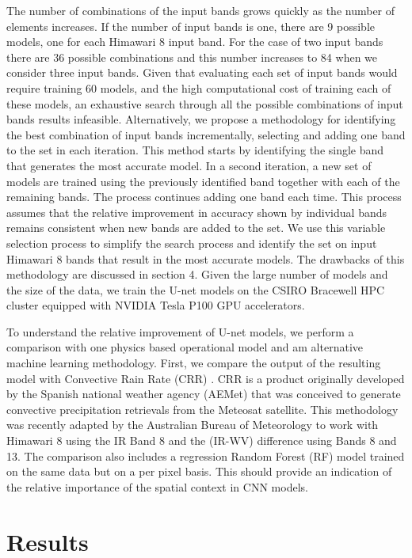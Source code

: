 \documentclass[3p,times]{elsarticle}
\begin{document}
The number of combinations of the input bands grows quickly as the number of elements increases. If the number of input bands is one, there are 9 possible models, one for each Himawari 8 input band. For the case of two input bands there are 36 possible combinations and this number increases to 84 when we consider three input bands. Given that evaluating each set of input bands would require training 60 models, and the high computational cost of training each of these models, an exhaustive search through all the possible combinations of input bands results infeasible. Alternatively, we propose a methodology for identifying the best combination of input bands incrementally, selecting and adding one band to the set in each iteration. This method starts by identifying the single band that generates the most accurate model. In a second iteration, a new set of models are trained using the previously identified band together with each of the remaining bands. The process continues adding one band each time. This process assumes that the relative improvement in accuracy shown by individual bands remains consistent when new bands are added to the set. We use this variable selection process to simplify the search process and identify the set on input Himawari 8 bands that result in the most accurate models. The drawbacks of this methodology are discussed in section 4. Given the large number of models and the size of the data, we train the U-net models on the CSIRO Bracewell HPC cluster equipped with NVIDIA Tesla P100 GPU accelerators. 

To understand the relative improvement of U-net models, we perform a comparison with one physics based operational model and am alternative machine learning methodology. First, we compare the output of the resulting model with Convective Rain Rate (CRR) \citep{aemetsaf2013}. CRR is a product originally developed by the Spanish national weather agency (AEMet) that was conceived to generate convective precipitation retrievals from the Meteosat satellite. This methodology was recently adapted by the Australian Bureau of Meteorology to work with Himawari 8 using the IR Band 8 and the (IR-WV) difference using Bands 8 and 13. The comparison also includes a regression Random Forest (RF) model \citep{breiman2001random} trained on the same data but on a per pixel basis. This should provide an indication of the relative importance of the spatial context in CNN models.


\section{Results}
\end{document}
